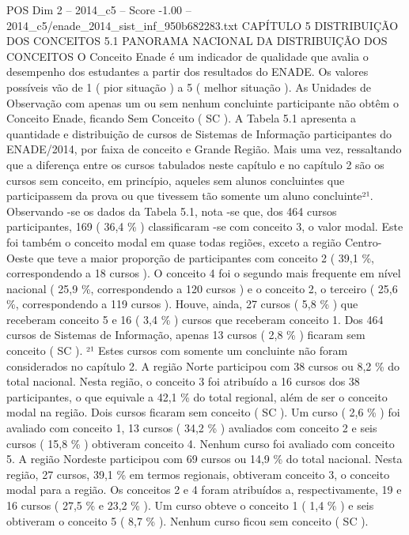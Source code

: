 \begin{textsample}{POS Dim 2 – 2014\_c5 – Score -1.00 – 2014\_c5/enade\_2014\_sist\_inf\_950b682283.txt}  \label{ex:f2_pos_308}
CAPÍTULO 5 DISTRIBUIÇÃO DOS CONCEITOS 5.1 PANORAMA NACIONAL DA DISTRIBUIÇÃO DOS CONCEITOS O Conceito Enade é um indicador de qualidade que avalia o desempenho dos estudantes a partir dos resultados do ENADE.
Os valores possíveis vão de 1 ( pior situação ) a 5 ( melhor situação ).
As Unidades de Observação com apenas um ou sem nenhum concluinte participante não obtêm o Conceito Enade, ficando Sem Conceito ( SC ).
A Tabela 5.1 apresenta a quantidade e distribuição de cursos de Sistemas de Informação participantes do ENADE/2014, por faixa de conceito e Grande Região.
Mais uma vez, ressaltando que a diferença entre os cursos tabulados neste capítulo e no capítulo 2 são os cursos sem conceito, em princípio, aqueles sem alunos concluintes que participassem da prova ou que tivessem tão somente um aluno concluinte²¹.
Observando -se os dados da Tabela 5.1, nota -se que, dos 464 cursos participantes, 169 ( 36,4 \% ) classificaram -se com conceito 3, o valor modal.
Este foi também o conceito modal em quase todas regiões, exceto a região Centro-Oeste que teve a maior proporção de participantes com conceito 2 ( 39,1 \%, correspondendo a 18 cursos ).
O conceito 4 foi o segundo mais frequente em nível nacional ( 25,9 \%, correspondendo a 120 cursos ) e o conceito 2, o terceiro ( 25,6 \%, correspondendo a 119 cursos ).
Houve, ainda, 27 cursos ( 5,8 \% ) que receberam conceito 5 e 16 ( 3,4 \% ) cursos que receberam conceito 1.
Dos 464 cursos de Sistemas de Informação, apenas 13 cursos ( 2,8 \% ) ficaram sem conceito ( SC ). ²¹ Estes cursos com somente um concluinte não foram considerados no capítulo 2.
A região Norte participou com 38 cursos ou 8,2 \% do total nacional.
Nesta região, o conceito 3 foi atribuído a 16 cursos dos 38 participantes, o que equivale a 42,1 \% do total regional, além de ser o conceito modal na região.
Dois cursos ficaram sem conceito ( SC ).
Um curso ( 2,6 \% ) foi avaliado com conceito 1, 13 cursos ( 34,2 \% ) avaliados com conceito 2 e seis cursos ( 15,8 \% ) obtiveram conceito 4.
Nenhum curso foi avaliado com conceito 5.
A região Nordeste participou com 69 cursos ou 14,9 \% do total nacional.
Nesta região, 27 cursos, 39,1 \% em termos regionais, obtiveram conceito 3, o conceito modal para a região.
Os conceitos 2 e 4 foram atribuídos a, respectivamente, 19 e 16 cursos ( 27,5 \% e 23,2 \% ).
Um curso obteve o conceito 1 ( 1,4 \% ) e seis obtiveram o conceito 5 ( 8,7 \% ).
Nenhum curso ficou sem conceito ( SC ).

\end{textsample}

